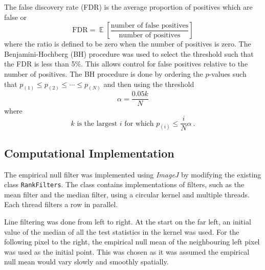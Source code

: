 \documentclass{article}
\DeclareMathOperator{\expectation}{\mathbb{E}}
\begin{document}
The false discovery rate (FDR) is the average proportion of positives which are false or
\begin{equation}
\text{FDR}=\expectation\left[\dfrac{\text{number of false positives}}{\text{number of positives}}\right]
\end{equation}
where the ratio is defined to be zero when the number of positives is zero. The Benjamini-Hochberg (BH) \citep{benjamini1995controlling} procedure was used to select the threshold such that the FDR is less than 5\%. This allows control for false positives relative to the number of positives. The BH procedure is done by ordering the $p$-values such that $p_{(1)}\leqslant p_{(2)}\leqslant \cdots \leqslant p_{(N)}$ and then using the threshold
\begin{equation}
  \alpha = \frac{0.05 k}{N}
\end{equation}
where
\begin{equation}
  k\text{ is the largest }i\text{ for which }p_{(i)}\leqslant\frac{i}{N}\alpha
  \ .
\end{equation}

\subsection{Computational Implementation}
\label{subsection:computational}

The empirical null filter was implemented using \emph{ImageJ} \citep{abramoff2004image, perez2013image, schindelin2012fiji, schneider2012nih} by modifying the existing class \texttt{RankFilters}. The class contains implementations of filters, such as the mean filter and the median filter, using a circular kernel and multiple threads. Each thread filters a row in parallel.

Line filtering was done from left to right. At the start on the far left, an initial value of the median of all the test statistics in the kernel was used. For the following pixel to the right, the empirical null mean of the neighbouring left pixel was used as the initial point. This was chosen as it was assumed the empirical null mean would vary slowly and smoothly spatially.
\end{document}
